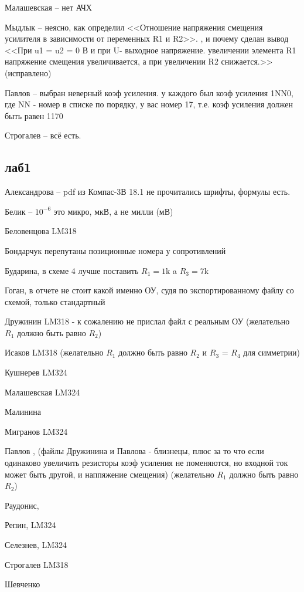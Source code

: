 \documentclass[a4paper,11pt]{article}
\begin{document}
Малашевская -- нет АЧХ

Мыдлык -- неясно, как определил <<Отношение напряжения смещения усилителя в зависимости от переменных R1 и R2>>.
, и почему сделан вывод 
<<При u1 = u2 = 0 В и при U- выходное напряжение. увеличении элемента R1 напряжение смещения увеличивается, а при увеличении R2 снижается.>>(исправлено)

Павлов -- выбран неверный коэф усиления. у каждого был коэф усиления 1NN0, где NN - номер в списке по порядку, у вас номер 17, т.е. коэф усиления должен быть равен 1170

Строгалев -- всё есть.
\newpage
\subsection*{лаб1}
Александрова -- pdf из Компас-3В 18.1 не прочитались шрифты, формулы есть.

Белик        -- $10^{-6}$ это микро, мкВ, а не милли (мВ)

Беловенцова     LM318

Бондарчук  перепутаны позиционные номера у сопротивлений

Бударина, в схеме 4 лучше поставить $R_1=1$k a $R_3=7$k

Гоган, в отчете не стоит какой именно ОУ, судя по экспортированному файлу со схемой, только стандартный

Дружинин  LM318 - к сожалению не прислал файл с реальным ОУ (желательно $R_1$ должно быть равно $R_2$)

Исаков  LM318 (желательно $R_1$ должно быть равно $R_2$ и $R_3$ = $R_4$  для симметрии)

Кушнерев LM324

Малашевская LM324

Малинина

Мигранов LM324


Павлов , (файлы Дружинина и Павлова - близнецы, плюс за то что если одинаково увеличить резисторы коэф усиления не поменяются, но входной ток может быть другой, и наппяжение смещения)
(желательно $R_1$ должно быть равно $R_2$)

Раудонис, 

Репин, LM324

Селезнев, LM324

Строгалев LM318

Шевченко
\end{document}
